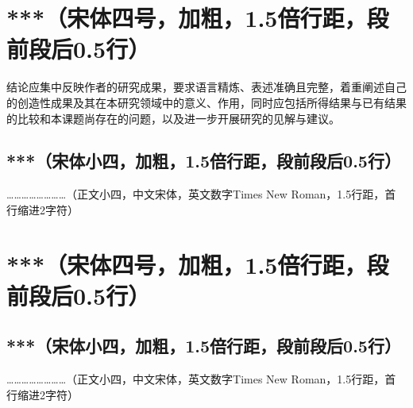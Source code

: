 ﻿%
%


\section{***（宋体四号，加粗，1.5倍行距，段前段后0.5行）}

结论应集中反映作者的研究成果，要求语言精炼、表述准确且完整，着重阐述自己的创造性成果及其在本研究领域中的意义、作用，同时应包括所得结果与已有结果的比较和本课题尚存在的问题，以及进一步开展研究的见解与建议。

\subsection{***（宋体小四，加粗，1.5倍行距，段前段后0.5行）}

……………………（正文小四，中文宋体，英文数字Times New Roman，1.5行距，首行缩进2字符）

\section{***（宋体四号，加粗，1.5倍行距，段前段后0.5行）}

\subsection{***（宋体小四，加粗，1.5倍行距，段前段后0.5行）}

……………………（正文小四，中文宋体，英文数字Times New Roman，1.5行距，首行缩进2字符）
